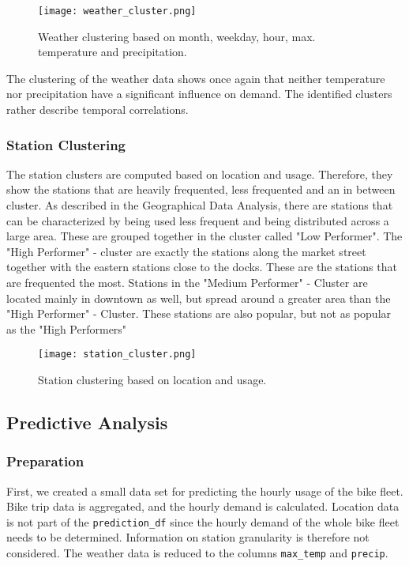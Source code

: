 \begin{figure}[hbtp]
    \texttt{[image: weather\_cluster.png]}
    \caption{Weather clustering based on month, weekday, hour, max. temperature and precipitation.}
\end{figure}

The clustering of the weather data shows once again that neither temperature nor precipitation have a significant influence on demand. The identified clusters rather describe temporal correlations.

\subsubsection{Station Clustering}

The station clusters are computed based on location and usage. Therefore, they show the stations that are heavily frequented, less frequented and an in between cluster. As described in the Geographical Data Analysis, there are stations that can be characterized by being used less frequent and being distributed across a large area. These are grouped together in the cluster called "Low Performer". The "High Performer" - cluster are exactly the stations along the market street together with the eastern stations close to the docks. These are the stations that are frequented the most. Stations in the "Medium Performer" - Cluster are located mainly in downtown as well, but spread around a greater area than the "High Performer" - Cluster. These stations are also popular, but not as popular as the "High Performers" 

\begin{figure}[hbtp]
    \texttt{[image: station\_cluster.png]}
    \caption{Station clustering based on location and usage.}
\end{figure}


\subsection{Predictive Analysis}

\subsubsection{Preparation}
First, we created a small data set for predicting the hourly usage of the bike fleet. Bike trip data is aggregated, and the hourly demand is calculated. Location data is not part of the \texttt{prediction\_df} since the hourly demand of the whole bike fleet needs to be determined. Information on station granularity is therefore not considered. The weather data is reduced to the columns \texttt{max\_temp} and \texttt{precip}. 

